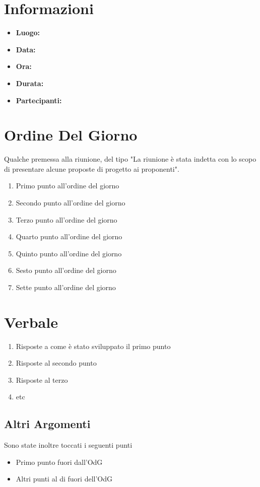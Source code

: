\documentclass[a4paper,titlepage]{article}
\begin{document}
\maketitle

\newpage
\tableofcontents

\newpage
\section{Informazioni}
\label{sec:Informazioni}

\begin{itemize}
  \item \textbf{Luogo: }
  \item \textbf{Data: }
  \item \textbf{Ora: }
  \item \textbf{Durata: }
  \item \textbf{Partecipanti: }
\end{itemize}

\newpage
\section{Ordine Del Giorno}
\label{sec:OrdineDelGiorno}

Qualche premessa alla riunione, del tipo "La riunione è stata indetta con lo scopo di presentare alcune proposte di progetto ai proponenti".

\begin{enumerate}
  \item Primo punto all'ordine del giorno
  \item Secondo punto all'ordine del giorno
  \item Terzo punto all'ordine del giorno
  \item Quarto punto all'ordine del giorno
  \item Quinto punto all'ordine del giorno
  \item Sesto punto all'ordine del giorno
  \item Sette punto all'ordine del giorno
\end{enumerate}

\newpage
\section{Verbale}
\label{sec:Verbale}

\begin{enumerate}
  \item Risposte a come è stato sviluppato il primo punto
  \item Risposte al secondo punto
  \item Risposte al terzo
  \item etc
\end{enumerate}

\subsection{Altri Argomenti}
\label{sub:AltriArgomenti}

Sono state inoltre toccati i seguenti punti

\begin{itemize}
  \item Primo punto fuori dall'OdG
  \item Altri punti al di fuori dell'OdG
\end{itemize}
\end{document}
